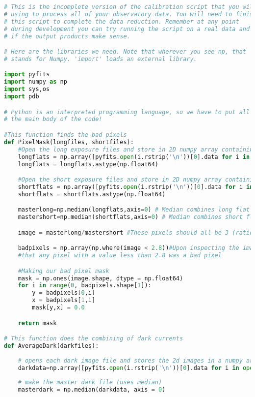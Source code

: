 \documentclass{aastex}
\begin{document}
\begin{lstlisting}[language=Python, caption= Cleans science images (YM)]
# This is the incomplete version of the calibration script that you will be
# using to process all of your observatory data. You will need to finish 
# this script to complete the data reduction. Remember at any point
# during development you can try running the script on a real data and see
# if the output products make sense.

# Here are the libraries we need. Note that wherever you see np, that
# stands for Numpy. 'import' loads an external library.

import pyfits
import numpy as np
import sys,os
import pdb

# Python is an interpreted programming language, so we have to put all of our functions BEFORE
# the main body of the code!

#This function finds the bad pixels
def PixelMask(longfiles, shortfiles):
	#Open the long exposure files and store in 2D numpy array containing doubles
	longflats = np.array([pyfits.open(i.rstrip('\n'))[0].data for i in open(longfiles)])
	longflats = longflats.astype(np.float64)

	#Open the short exposure files and store in 2D numpy array containing doubles
	shortflats = np.array([pyfits.open(i.rstrip('\n'))[0].data for i in open(shortfiles)])
	shortflats = shortflats.astype(np.float64)

	masterlong=np.median(longflats,axis=0) # Median combines long flat images
	mastershort=np.median(shortflats,axis=0) # Median combines short flat images

	image = masterlong/mastershort #These pixels should all be 3 (ratio of our exposure times)

	badpixels = np.array(np.where(image < 2.8))#Upon inspecting the image with ds9, we determined 
	#that any pixel with a value less than 2.8 was a bad pixel

	#Making our bad pixel mask
	mask = np.ones(image.shape, dtype = np.float64)
	for i in range(0, badpixels.shape[1]):
		y = badpixels[0,i]
		x = badpixels[1,i]
		mask[y,x] = 0.0

	return mask

# This function does the combining of dark currents
def AverageDark(darkfiles):
	
	# opens each dark image file and stores the 2d images in a numpy array
	darkdata=np.array([pyfits.open(i.rstrip('\n'))[0].data for i in open(darkfiles)])
	
	# make the master dark file (uses median)
	masterdark = np.median(darkdata, axis = 0)
	

\end{lstlisting}
\end{document}
